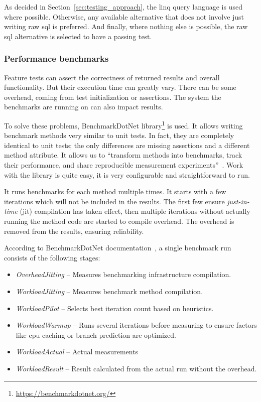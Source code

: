 As decided in Section~\ref{sec:testing_approach}, the \acrshort{linq} query language is used where possible. Otherwise, any available alternative that does not involve just writing raw \acrshort{sql} is preferred. And finally, where nothing else is possible, the raw \acrshort{sql} alternative is selected to have a passing test.  

\subsubsection{Performance benchmarks}
Feature tests can assert the correctness of returned results and overall functionality. But their execution time can greatly vary. There can be some overhead, coming from test initialization or assertions. The system the benchmarks are running on can also impact results.

To solve these problems, BenchmarkDotNet library\footnote{\url{https://benchmarkdotnet.org/}} is used. It allows writing benchmark methods very similar to unit tests. In fact, they are completely identical to unit tests; the only differences are missing assertions and a different method attribute. It allows us to ``transform methods into benchmarks, track their performance, and share reproducible measurement experiments''~\cite{BenchmarkDotNet}. Work with the library is quite easy, it is very configurable and straightforward to run. 

It runs benchmarks for each method multiple times. It starts with a few iterations which will not be included in the results. The first few ensure \textit{just-in-time} (\acrshort{jit}) compilation has taken effect, then multiple iterations without actually running the method code are started to compile overhead. The overhead is removed from the results, ensuring reliability. 

According to BenchmarkDotNet documentation~\cite{BenchmarkDotNetHow}, a single benchmark run consists of the following stages:
\begin{itemize}
    \item \textit{OverheadJitting} -- Measures benchmarking infrastructure compilation.
    \item \textit{WorkloadJitting} -- Measures benchmark method compilation.
    \item \textit{WorkloadPilot} -- Selects best iteration count based on heuristics.
    \item \textit{WorkloadWarmup} -- Runs several iterations before measuring to ensure factors like \acrshort{cpu} caching or branch prediction are optimized.
    \item \textit{WorkloadActual} -- Actual measurements
    \item \textit{WorkloadResult} -- Result calculated from the actual run without the overhead.
\end{itemize}

